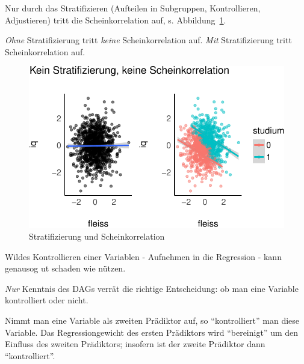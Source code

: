 \documentclass[
  a4paper,
  DIV=11]{scrreprt}
\theoremstyle{definition}
\theoremstyle{remark}
\begin{document}
Nur durch das Stratifizieren (Aufteilen in Subgruppen, Kontrollieren,
Adjustieren) tritt die Scheinkorrelation auf, s.
Abbildung~\ref{fig-eignung-strat}.

\begin{tcolorbox}[enhanced jigsaw, leftrule=.75mm, left=2mm, bottomrule=.15mm, opacityback=0, coltitle=black, colbacktitle=quarto-callout-note-color!10!white, opacitybacktitle=0.6, rightrule=.15mm, toptitle=1mm, colback=white, colframe=quarto-callout-note-color-frame, arc=.35mm, toprule=.15mm, breakable, titlerule=0mm, bottomtitle=1mm, title=\textcolor{quarto-callout-note-color}{\faInfo}\hspace{0.5em}{Hinweis}]
\emph{Ohne} Stratifizierung tritt \emph{keine} Scheinkorrelation auf.
\emph{Mit} Stratifizierung tritt Scheinkorrelation auf.
\end{tcolorbox}

\begin{figure}

{\centering \includegraphics{./kausal_files/figure-pdf/fig-eignung-strat-1.pdf}

}

\caption{\label{fig-eignung-strat}Stratifizierung und Scheinkorrelation}

\end{figure}

Wildes Kontrollieren einer Variablen - Aufnehmen in die Regression -
kann genausog ut schaden wie nützen.

\emph{Nur} Kenntnis des DAGs verrät die richtige Entscheidung: ob man
eine Variable kontrolliert oder nicht.

\begin{tcolorbox}[enhanced jigsaw, leftrule=.75mm, left=2mm, bottomrule=.15mm, opacityback=0, coltitle=black, colbacktitle=quarto-callout-note-color!10!white, opacitybacktitle=0.6, rightrule=.15mm, toptitle=1mm, colback=white, colframe=quarto-callout-note-color-frame, arc=.35mm, toprule=.15mm, breakable, titlerule=0mm, bottomtitle=1mm, title=\textcolor{quarto-callout-note-color}{\faInfo}\hspace{0.5em}{Hinweis}]
Nimmt man eine Variable als zweiten Prädiktor auf, so ``kontrolliert''
man diese Variable. Das Regressiongewicht des ersten Prädiktors wird
``bereinigt'' um den Einfluss des zweiten Prädiktors; insofern ist der
zweite Prädiktor dann ``kontrolliert''.
\end{tcolorbox}
\end{document}
